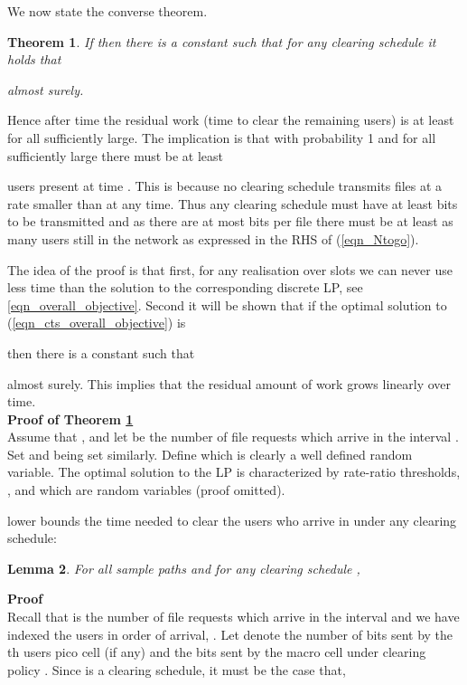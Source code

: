 \documentclass[12pt, draftcls, onecolumn]{IEEEtranTCOM}
\newtheorem{theorem}{Theorem}
\newtheorem{lemma}[theorem]{Lemma}
\begin{document}
{We now state the converse theorem.
\begin{theorem}
\label{thm_main}
If  then there is a constant  such that for any clearing schedule 
it holds that

almost surely.
\end{theorem}

Hence after time  the residual work (time to clear
the remaining users) is at least  for all  sufficiently large. The implication is that with probability 1 and for all 
sufficiently large there must be at least

users present at time . This is because no clearing schedule transmits files at a rate smaller than  at any time. Thus any clearing schedule must have at least  bits to be transmitted and as there are at most  bits per file there must be at least as many users still in the network as expressed in the RHS of (\ref{eqn_Ntogo}).



The idea of the proof is that first, for any realisation over
 slots we can never use less time than the solution to the corresponding discrete
LP, see \eqref{eqn_overall_objective}. Second it will be shown that if the optimal
solution to (\ref{eqn_cts_overall_objective}) is

then there is a constant  such that

almost surely. This implies that the residual amount of work grows
linearly over time. \\
{\bf Proof of Theorem \ref{thm_main}} \\
Assume that , and let  be the number of file requests which arrive in the interval .
Set  and  being set similarly.
Define  which is clearly a well defined random variable.
The optimal solution to the LP is characterized by rate-ratio thresholds, , and which are random variables (proof omitted).


 lower bounds the time needed to clear the users who arrive in  under any clearing schedule:
\begin{lemma}
\label{lem_sample}
For all sample paths  and for any clearing schedule ,

\end{lemma}
{\bf Proof} \\
Recall that  is the number of file requests which arrive in the interval  and we have indexed the users in order of arrival,
. Let  denote the number of bits sent by the th users pico cell (if any) and the
bits sent by the macro cell under clearing policy . Since  is a clearing schedule,  it must be the case that,

}
\end{document}
